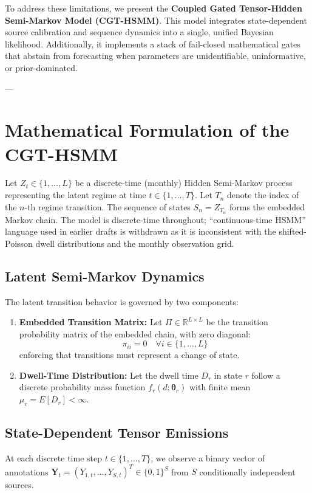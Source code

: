 \documentclass[11pt,a4paper]{article}
\begin{document}
To address these limitations, we present the \textbf{Coupled Gated Tensor-Hidden Semi-Markov Model (CGT-HSMM)}. This model integrates state-dependent source calibration and sequence dynamics into a single, unified Bayesian likelihood. Additionally, it implements a stack of fail-closed mathematical gates that abstain from forecasting when parameters are unidentifiable, uninformative, or prior-dominated.

---

\section{Mathematical Formulation of the CGT-HSMM}

Let $Z_t \in \{1, \dots, L\}$ be a discrete-time (monthly) Hidden Semi-Markov process representing the latent regime at time $t \in \{1, \dots, T\}$. Let $T_n$ denote the index of the $n$-th regime transition. The sequence of states $S_n = Z_{T_n}$ forms the embedded Markov chain. The model is discrete-time throughout; ``continuous-time HSMM'' language used in earlier drafts is withdrawn as it is inconsistent with the shifted-Poisson dwell distributions and the monthly observation grid. %

\subsection{Latent Semi-Markov Dynamics}
The latent transition behavior is governed by two components:
\begin{enumerate}
    \item \textbf{Embedded Transition Matrix:} Let $\Pi \in \mathbb{R}^{L \times L}$ be the transition probability matrix of the embedded chain, with zero diagonal:
    \[
    \pi_{ii} = 0 \quad \forall i \in \{1, \dots, L\}
    \]
    enforcing that transitions must represent a change of state.
    \item \textbf{Dwell-Time Distribution:} Let the dwell time $D_r$ in state $r$ follow a discrete probability mass function $f_r(d; \boldsymbol{\theta}_r)$ with finite mean $\mu_r = E[D_r] < \infty$.
\end{enumerate}

\subsection{State-Dependent Tensor Emissions}
At each discrete time step $t \in \{1, \dots, T\}$, we observe a binary vector of annotations $\mathbf{Y}_t = (Y_{1,t}, \dots, Y_{S,t})^T \in \{0, 1\}^S$ from $S$ conditionally independent sources.
\end{document}
